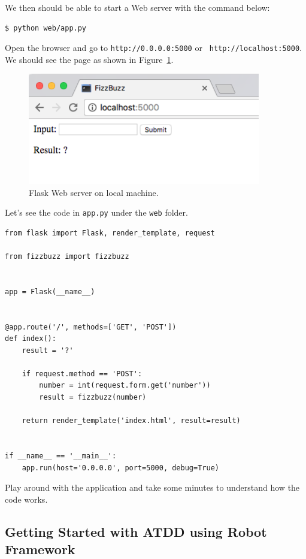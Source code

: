 \documentclass{article}
\begin{document}
\noindent We then should be able to start a Web server with the command below:

\begin{verbatim}
$ python web/app.py
\end{verbatim}

\noindent Open the browser and go to {\tt http://0.0.0.0:5000} or {\tt
http://localhost:5000}. We should see the page as shown in
Figure~\ref{fig:flask-web-server-local}. \\

\begin{figure}[t]
  \centering
  \includegraphics[width=4in]{figures/flask-web-server-local}
  \caption{Flask Web server on local machine.}
  \label{fig:flask-web-server-local}
\end{figure}

\noindent Let's see the code in {\tt app.py} under the {\tt web} folder.

\begin{verbatim}
from flask import Flask, render_template, request

from fizzbuzz import fizzbuzz


app = Flask(__name__)


@app.route('/', methods=['GET', 'POST'])
def index():
    result = '?'

    if request.method == 'POST':
        number = int(request.form.get('number'))
        result = fizzbuzz(number)

    return render_template('index.html', result=result)


if __name__ == '__main__':
    app.run(host='0.0.0.0', port=5000, debug=True)
\end{verbatim}

\noindent Play around with the application and take some minutes to understand
how the code works.

\subsection*{Getting Started with ATDD using Robot Framework}
\end{document}
